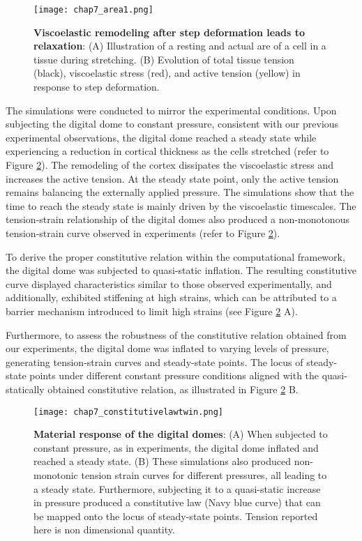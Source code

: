 \begin{figure}[b!]
	\centering
	\texttt{[image: chap7\_area1.png]}
	\caption{\label{fig_7_7a} \textbf{Viscoelastic remodeling after step deformation leads to relaxation}: (A) Illustration of a resting and actual are of a cell in a tissue during stretching. (B) Evolution of total tissue tension (black), viscoelastic stress (red), and active tension (yellow) in response to step deformation.
	}
\end{figure}

The simulations were conducted to mirror the experimental conditions. Upon subjecting the digital dome to constant pressure, consistent with our previous experimental observations, the digital dome reached a steady state while experiencing a reduction in cortical thickness as the cells stretched (refer to Figure \ref{fig_7_7}). The remodeling of the cortex dissipates the viscoelastic stress and increases the active tension. At the steady state point, only the active tension remains balancing the externally applied pressure. The simulations show that the time to reach the steady state is mainly driven by the viscoelastic timescales. The tension-strain relationship of the digital domes also produced a non-monotonous tension-strain curve observed in experiments (refer to Figure \ref{fig_7_7}).

To derive the proper constitutive relation within the computational framework, the digital dome was subjected to quasi-static inflation. The resulting constitutive curve displayed characteristics similar to those observed experimentally, and additionally, exhibited stiffening at high strains, which can be attributed to a barrier mechanism introduced to limit high strains (see Figure \ref{fig_7_7} A).

Furthermore, to assess the robustness of the constitutive relation obtained from our experiments, the digital dome was inflated to varying levels of pressure, generating tension-strain curves and steady-state points. The locus of steady-state points under different constant pressure conditions aligned with the quasi-statically obtained constitutive relation, as illustrated in Figure  \ref{fig_7_7} B.


\begin{figure}[t]
	\centering
	\texttt{[image: chap7\_constitutivelawtwin.png]}
	\caption{\label{fig_7_7} \textbf{Material response of the digital domes}: (A) When subjected to constant pressure, as in experiments, the digital dome inflated and reached a steady state. (B) These simulations also produced non-monotonic tension strain curves for different pressures, all leading to a steady state. Furthermore, subjecting it to a quasi-static increase in pressure produced a constitutive law (Navy blue curve) that can be mapped onto the locus of steady-state points. Tension reported here is non dimensional quantity.}
\end{figure}

